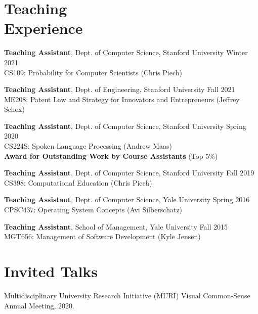 \documentclass[margin, 10pt]{res} %
\begin{document}
\begin{resume}

\section{Teaching \\ Experience}

\textbf{Teaching Assistant}, Dept. of Computer Science, Stanford University \hfill Winter 2021\\
CS109: Probability for Computer Scientists (Chris Piech)

\textbf{Teaching Assistant}, Dept. of Engineering, Stanford University \hfill Fall 2021\\
ME208: Patent Law and Strategy for Innovators and Entrepreneurs (Jeffrey Schox)

\textbf{Teaching Assistant}, Dept. of Computer Science, Stanford University \hfill Spring 2020\\
CS224S: Spoken Language Processing (Andrew Maas)\\
\textbf{Award for Outstanding Work by Course Assistants} (Top 5\%)

\textbf{Teaching Assistant}, Dept. of Computer Science, Stanford University \hfill Fall 2019\\
CS398: Computational Education (Chris Piech)

\textbf{Teaching Assistant}, Dept. of Computer Science, Yale University \hfill Spring 2016\\
CPSC437: Operating System Concepts (Avi Silberschatz)

\textbf{Teaching Assistant}, School of Management, Yale University \hfill Fall 2015\\
MGT656: Management of Software Development (Kyle Jensen)


\section{Invited Talks}

Multidisciplinary University Research Initiative (MURI) Visual Common-Sense Annual Meeting, 2020.


\end{resume}
\end{document}
